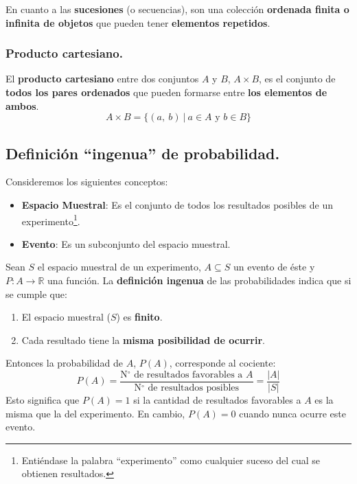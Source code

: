 \documentclass[12pt]{article}
\begin{document}
En cuanto a las \textbf{sucesiones} (o secuencias), son una colección \textbf{ordenada finita o infinita de objetos} que pueden tener \textbf{elementos repetidos}.

\subsubsection{Producto cartesiano.}

El \textbf{producto cartesiano} entre dos conjuntos $A$ y $B$, $A \times B$, es el conjunto de \textbf{todos los pares ordenados} que pueden formarse entre \textbf{los elementos de ambos}.
\[
  A \times B = \{(a, \ b) \ | \ a \in A \text{ y } b \in B\}
\]

\subsection{Definición ``ingenua'' de probabilidad.}

Consideremos los siguientes conceptos:

\begin{itemize}
\item \textbf{Espacio Muestral}: Es el conjunto de todos los resultados posibles de un experimento\footnote{Entiéndase la palabra ``experimento'' como cualquier suceso del cual se obtienen resultados.}.

\item \textbf{Evento}: Es un subconjunto del espacio muestral.
\end{itemize}

Sean $S$ el espacio muestral de un experimento, $A \subseteq S$ un evento de éste y $P:A \to \mathbb{R}$ una función. La \textbf{definición ingenua} de las probabilidades indica que si se cumple que:

\begin{enumerate}
\item El espacio muestral ($S$) es \textbf{finito}.
\item Cada resultado tiene la \textbf{misma posibilidad de ocurrir}.
\end{enumerate}

Entonces la probabilidad de $A$, $P(A)$, corresponde al cociente:
\[
  P(A) = \frac{\text{N$^{\circ}$ de resultados favorables a } A}{\text{N$^{\circ}$ de resultados posibles}} = \frac{|A|}{|S|}
\]
Esto significa que $P(A) = 1$ si la cantidad de resultados favorables a $A$ es la misma que la del experimento. En cambio, $P(A) = 0$ cuando nunca ocurre este evento.
\end{document}

